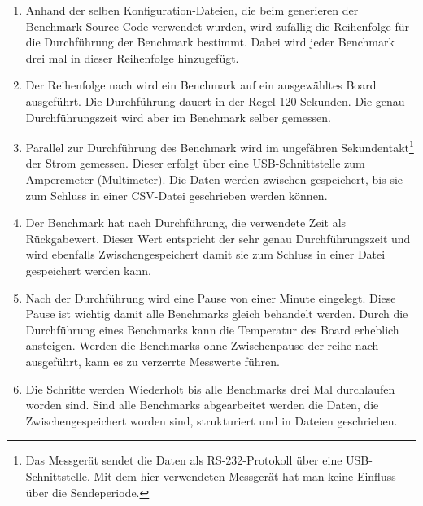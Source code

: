 \begin{enumerate}
\item Anhand der selben Konfiguration-Dateien, die beim generieren der Benchmark-Source-Code verwendet wurden, wird zufällig die Reihenfolge für die Durchführung der Benchmark bestimmt. Dabei wird jeder Benchmark drei mal in dieser Reihenfolge hinzugefügt.
\item Der Reihenfolge nach wird ein Benchmark auf ein ausgewähltes Board ausgeführt. Die Durchführung dauert in der Regel 120 Sekunden. Die genau Durchführungszeit wird aber im Benchmark selber gemessen.
\item Parallel zur Durchführung des Benchmark wird im ungefähren Sekundentakt\footnote{Das Messgerät sendet die Daten als RS-232-Protokoll über eine USB-Schnittstelle. Mit dem hier verwendeten Messgerät hat man keine Einfluss über die Sendeperiode.} der Strom gemessen. Dieser erfolgt über eine USB-Schnittstelle zum Amperemeter (Multimeter). Die Daten werden zwischen gespeichert, bis sie zum Schluss in einer CSV-Datei geschrieben werden können.
\item Der Benchmark hat nach Durchführung, die verwendete Zeit als Rückgabewert. Dieser Wert entspricht der sehr genau Durchführungszeit und wird ebenfalls Zwischengespeichert damit sie zum Schluss in einer Datei gespeichert werden kann.
\item Nach der Durchführung wird eine Pause von einer Minute eingelegt. Diese Pause ist wichtig damit alle Benchmarks gleich behandelt werden. Durch die Durchführung eines Benchmarks kann die Temperatur des Board erheblich ansteigen. Werden die Benchmarks ohne Zwischenpause der reihe nach ausgeführt, kann es zu verzerrte Messwerte führen.
\item Die Schritte werden Wiederholt bis alle Benchmarks drei Mal durchlaufen worden sind. Sind alle Benchmarks abgearbeitet werden die Daten, die Zwischengespeichert worden sind, strukturiert und in Dateien geschrieben.
\end{enumerate}